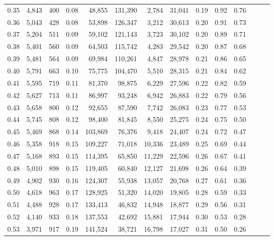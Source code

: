 \begin{tabular}{rrrrrrrrrrrrrr}
0.35 &  4,843 &    400 &  0.08 &   48,855 &  131,390 &   2,784 &  31,041 &  0.19 &  0.92 &      0.76 \\
0.36 &  5,043 &    428 &  0.08 &   53,898 &  126,347 &   3,212 &  30,613 &  0.20 &  0.91 &      0.73 \\
0.37 &  5,204 &    511 &  0.09 &   59,102 &  121,143 &   3,723 &  30,102 &  0.20 &  0.89 &      0.71 \\
0.38 &  5,401 &    560 &  0.09 &   64,503 &  115,742 &   4,283 &  29,542 &  0.20 &  0.87 &      0.68 \\
0.39 &  5,481 &    564 &  0.09 &   69,984 &  110,261 &   4,847 &  28,978 &  0.21 &  0.86 &      0.65 \\
0.40 &  5,791 &    663 &  0.10 &   75,775 &  104,470 &   5,510 &  28,315 &  0.21 &  0.84 &      0.62 \\
0.41 &  5,595 &    719 &  0.11 &   81,370 &   98,875 &   6,229 &  27,596 &  0.22 &  0.82 &      0.59 \\
0.42 &  5,627 &    713 &  0.11 &   86,997 &   93,248 &   6,942 &  26,883 &  0.22 &  0.79 &      0.56 \\
0.43 &  5,658 &    800 &  0.12 &   92,655 &   87,590 &   7,742 &  26,083 &  0.23 &  0.77 &      0.53 \\
0.44 &  5,745 &    808 &  0.12 &   98,400 &   81,845 &   8,550 &  25,275 &  0.24 &  0.75 &      0.50 \\
0.45 &  5,469 &    868 &  0.14 &  103,869 &   76,376 &   9,418 &  24,407 &  0.24 &  0.72 &      0.47 \\
0.46 &  5,358 &    918 &  0.15 &  109,227 &   71,018 &  10,336 &  23,489 &  0.25 &  0.69 &      0.44 \\
0.47 &  5,168 &    893 &  0.15 &  114,395 &   65,850 &  11,229 &  22,596 &  0.26 &  0.67 &      0.41 \\
0.48 &  5,010 &    898 &  0.15 &  119,405 &   60,840 &  12,127 &  21,698 &  0.26 &  0.64 &      0.39 \\
0.49 &  4,902 &    930 &  0.16 &  124,307 &   55,938 &  13,057 &  20,768 &  0.27 &  0.61 &      0.36 \\
0.50 &  4,618 &    963 &  0.17 &  128,925 &   51,320 &  14,020 &  19,805 &  0.28 &  0.59 &      0.33 \\
0.51 &  4,488 &    928 &  0.17 &  133,413 &   46,832 &  14,948 &  18,877 &  0.29 &  0.56 &      0.31 \\
0.52 &  4,140 &    933 &  0.18 &  137,553 &   42,692 &  15,881 &  17,944 &  0.30 &  0.53 &      0.28 \\
0.53 &  3,971 &    917 &  0.19 &  141,524 &   38,721 &  16,798 &  17,027 &  0.31 &  0.50 &      0.26 \\

\end{tabular}
